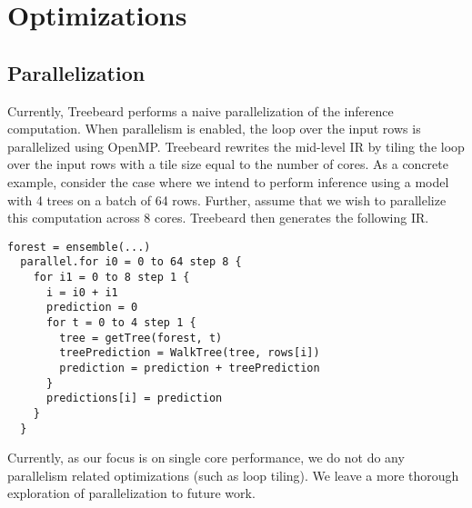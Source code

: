 \section{Optimizations}







\subsection{Parallelization}
Currently, Treebeard performs a naive parallelization of the inference computation. When parallelism is enabled, the 
loop over the input rows is parallelized using OpenMP. Treebeard rewrites 
the mid-level IR by tiling the loop over the input rows with a tile size equal to the number of cores. 
As a concrete example, consider the case where we intend to perform inference using a model with 4 trees 
on a batch of 64 rows. Further, assume that we wish to parallelize this computation across 8 cores. 
Treebeard then generates the following IR.
\begin{lstlisting}[style=c++]
  forest = ensemble(...)
  parallel.for i0 = 0 to 64 step 8 {
    for i1 = 0 to 8 step 1 {
      i = i0 + i1
      prediction = 0
      for t = 0 to 4 step 1 {
        tree = getTree(forest, t) 
        treePrediction = WalkTree(tree, rows[i])
        prediction = prediction + treePrediction
      }
      predictions[i] = prediction
    }
  }
\end{lstlisting}
Currently, as our focus is on single core performance, we do not 
do any parallelism related optimizations (such as loop tiling). We leave a more thorough exploration of parallelization 
to future work.